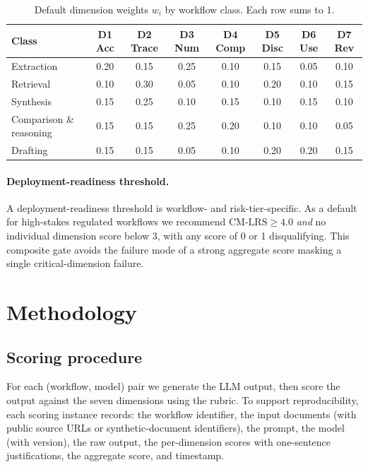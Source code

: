 \documentclass[11pt]{article}
\begin{document}
\begin{table}[h]
\centering
\caption{Default dimension weights $w_i$ by workflow class. Each row sums to 1.}
\label{tab:weights}
\small
\setlength{\tabcolsep}{4pt}
\begin{tabularx}{\textwidth}{@{}lccccccc@{}}
\toprule
\textbf{Class} & D1 Acc & D2 Trace & D3 Num & D4 Comp & D5 Disc & D6 Use & D7 Rev \\
\midrule
Extraction              & 0.20 & 0.15 & 0.25 & 0.10 & 0.15 & 0.05 & 0.10 \\
Retrieval               & 0.10 & 0.30 & 0.05 & 0.10 & 0.20 & 0.10 & 0.15 \\
Synthesis               & 0.15 & 0.25 & 0.10 & 0.15 & 0.10 & 0.15 & 0.10 \\
Comparison \& reasoning & 0.15 & 0.15 & 0.25 & 0.20 & 0.10 & 0.10 & 0.05 \\
Drafting                & 0.15 & 0.15 & 0.05 & 0.10 & 0.20 & 0.20 & 0.15 \\
\bottomrule
\end{tabularx}
\end{table}

\paragraph{Deployment-readiness threshold.} A deployment-readiness threshold is workflow- and risk-tier-specific. As a default for high-stakes regulated workflows we recommend $\mathrm{CM\text{-}LRS} \geq 4.0$ \emph{and} no individual dimension score below 3, with any score of 0 or 1 disqualifying. This composite gate avoids the failure mode of a strong aggregate score masking a single critical-dimension failure.

\section{Methodology}
\label{sec:method}

\subsection{Scoring procedure}

For each (workflow, model) pair we generate the LLM output, then score the output against the seven dimensions using the rubric. To support reproducibility, each scoring instance records: the workflow identifier, the input documents (with public source URLs or synthetic-document identifiers), the prompt, the model (with version), the raw output, the per-dimension scores with one-sentence justifications, the aggregate score, and timestamp.
\end{document}
